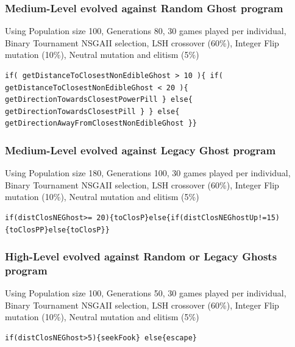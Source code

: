 \documentclass{llncs}
\begin{document}
\subsubsection{Medium-Level evolved against Random Ghost program} Using Population size 100, Generations 80, 30 games played per individual, Binary Tournament NSGAII selection, LSH crossover (60\%), Integer Flip mutation (10\%), Neutral mutation and elitism (5\%)

\begin{lstlisting}[frame=single, caption=caption, breaklines=true]
if( getDistanceToClosestNonEdibleGhost > 10 ){ if( getDistanceToClosestNonEdibleGhost < 20 ){ getDirectionTowardsClosestPowerPill } else{ getDirectionTowardsClosestPill } } else{ getDirectionAwayFromClosestNonEdibleGhost }}
\end{lstlisting} %

\subsubsection{Medium-Level evolved against Legacy Ghost program} Using Population size 180, Generations 100, 30 games played per individual, Binary Tournament NSGAII selection, LSH crossover (60\%), Integer Flip mutation (10\%), Neutral mutation and elitism (5\%)

\begin{lstlisting}[frame=single, caption=caption, breaklines=true]
if(distClosNEGhost>= 20){toClosP}else{if(distClosNEGhostUp!=15){toClosPP}else{toClosP}}
\end{lstlisting} %

\subsubsection{High-Level evolved against Random or Legacy Ghosts program} Using Population size 100, Generations 50, 30 games played per individual, Binary Tournament NSGAII selection, LSH crossover (60\%), Integer Flip mutation (10\%), Neutral mutation and elitism (5\%)

\begin{lstlisting}[frame=single, caption=caption, breaklines=true]
if(distClosNEGhost>5){seekFook} else{escape}
\end{lstlisting} %
\end{document}
